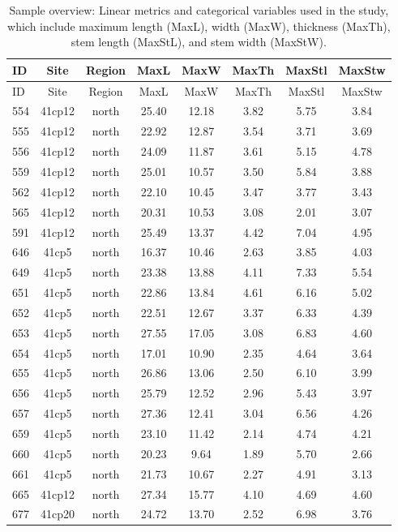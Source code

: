 \documentclass[smallextended]{svjour3}       %
\begin{document}
\begin{longtable}[]{@{}lccccccc@{}}
\caption{Sample overview: Linear metrics and categorical variables used
in the study, which include maximum length (MaxL), width (MaxW),
thickness (MaxTh), stem length (MaxStL), and stem width
(MaxStW).}\tabularnewline
\toprule()
ID & Site & Region & MaxL & MaxW & MaxTh & MaxStl & MaxStw \\
\midrule()
\endfirsthead
\toprule()
ID & Site & Region & MaxL & MaxW & MaxTh & MaxStl & MaxStw \\
\midrule()
\endhead
554 & 41cp12 & north & 25.40 & 12.18 & 3.82 & 5.75 & 3.84 \\
555 & 41cp12 & north & 22.92 & 12.87 & 3.54 & 3.71 & 3.69 \\
556 & 41cp12 & north & 24.09 & 11.87 & 3.61 & 5.15 & 4.78 \\
559 & 41cp12 & north & 25.01 & 10.57 & 3.50 & 5.84 & 3.88 \\
562 & 41cp12 & north & 22.10 & 10.45 & 3.47 & 3.77 & 3.43 \\
565 & 41cp12 & north & 20.31 & 10.53 & 3.08 & 2.01 & 3.07 \\
591 & 41cp12 & north & 25.49 & 13.37 & 4.42 & 7.04 & 4.95 \\
646 & 41cp5 & north & 16.37 & 10.46 & 2.63 & 3.85 & 4.03 \\
649 & 41cp5 & north & 23.38 & 13.88 & 4.11 & 7.33 & 5.54 \\
651 & 41cp5 & north & 22.86 & 13.84 & 4.61 & 6.16 & 5.02 \\
652 & 41cp5 & north & 22.51 & 12.67 & 3.37 & 6.33 & 4.39 \\
653 & 41cp5 & north & 27.55 & 17.05 & 3.08 & 6.83 & 4.60 \\
654 & 41cp5 & north & 17.01 & 10.90 & 2.35 & 4.64 & 3.64 \\
655 & 41cp5 & north & 26.86 & 13.06 & 2.50 & 6.10 & 3.99 \\
656 & 41cp5 & north & 25.79 & 12.52 & 2.96 & 5.43 & 3.97 \\
657 & 41cp5 & north & 27.36 & 12.41 & 3.04 & 6.56 & 4.26 \\
659 & 41cp5 & north & 23.10 & 11.42 & 2.14 & 4.74 & 4.21 \\
660 & 41cp5 & north & 20.23 & 9.64 & 1.89 & 5.70 & 2.66 \\
661 & 41cp5 & north & 21.73 & 10.67 & 2.27 & 4.91 & 3.13 \\
665 & 41cp12 & north & 27.34 & 15.77 & 4.10 & 4.69 & 4.60 \\
677 & 41cp20 & north & 24.72 & 13.70 & 2.52 & 6.98 & 3.76 \\

\end{longtable}
\end{document}
